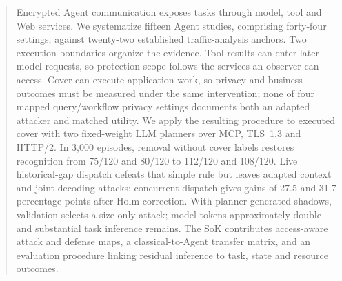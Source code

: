 \begin{abstract}
Encrypted Agent communication exposes tasks through model, tool and Web services. We systematize fifteen Agent studies, comprising forty-four settings, against twenty-two established traffic-analysis anchors. Two execution boundaries organize the evidence. Tool results can enter later model requests, so protection scope follows the services an observer can access. Cover can execute application work, so privacy and business outcomes must be measured under the same intervention; none of four mapped query/workflow privacy settings documents both an adapted attacker and matched utility. We apply the resulting procedure to executed cover with two fixed-weight LLM planners over MCP, TLS~1.3 and HTTP/2. In 3,000 episodes, removal without cover labels restores recognition from 75/120 and 80/120 to 112/120 and 108/120. Live historical-gap dispatch defeats that simple rule but leaves adapted context and joint-decoding attacks: concurrent dispatch gives gains of 27.5 and 31.7 percentage points after Holm correction. With planner-generated shadows, validation selects a size-only attack; model tokens approximately double and substantial task inference remains. The SoK contributes access-aware attack and defense maps, a classical-to-Agent transfer matrix, and an evaluation procedure linking residual inference to task, state and resource outcomes.
\end{abstract}
